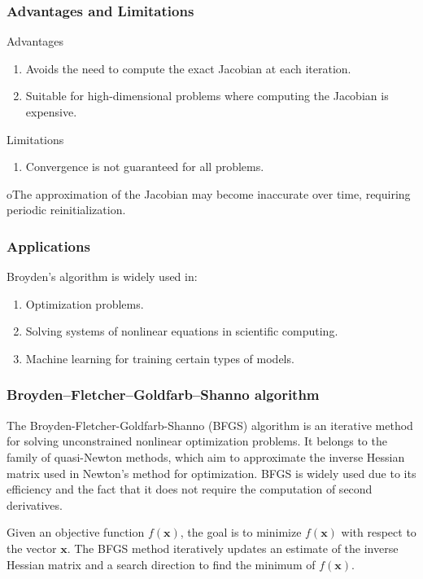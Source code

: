 \documentclass{beamer}
\begin{document}
\begin{frame}
\frametitle{Advantages and Limitations}

\begin{block}{Advantages }
\begin{enumerate}
\item Avoids the need to compute the exact Jacobian at each iteration.

\item Suitable for high-dimensional problems where computing the Jacobian is expensive.
\end{enumerate}

\noindent
\end{block}

\begin{block}{Limitations }
\begin{enumerate}
\item Convergence is not guaranteed for all problems.
\end{enumerate}

\noindent
oThe approximation of the Jacobian may become inaccurate over time, requiring periodic reinitialization.
\end{block}
\end{frame}

\begin{frame}
\frametitle{Applications}

Broyden’s algorithm is widely used in:
\begin{enumerate}
\item Optimization problems.

\item Solving systems of nonlinear equations in scientific computing.

\item Machine learning for training certain types of models.
\end{enumerate}

\noindent
\end{frame}

\begin{frame}
\frametitle{Broyden–Fletcher–Goldfarb–Shanno algorithm}

The Broyden-Fletcher-Goldfarb-Shanno (BFGS) algorithm is an iterative
method for solving unconstrained nonlinear optimization problems. It
belongs to the family of quasi-Newton methods, which aim to
approximate the inverse Hessian matrix used in Newton's method for
optimization. BFGS is widely used due to its efficiency and the fact
that it does not require the computation of second derivatives.

Given an objective function \( f(\mathbf{x}) \), the goal is to
minimize \( f(\mathbf{x}) \) with respect to the vector \( \mathbf{x}
\). The BFGS method iteratively updates an estimate of the inverse
Hessian matrix and a search direction to find the minimum of \(
f(\mathbf{x}) \).
\end{frame}
\end{document}
